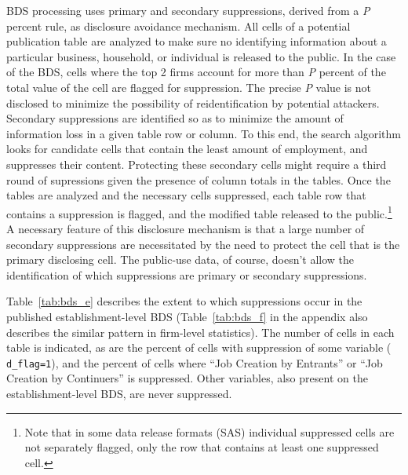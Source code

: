 
BDS processing uses primary and secondary suppressions, derived from a \emph{P} percent rule, as disclosure avoidance mechanism. All cells of a potential publication table are analyzed to make sure no identifying information about a particular business, household, or individual  is released to the public. In the case of the BDS, cells where the top 2 firms account for more than \emph{P} percent of the total value of the cell are flagged for suppression. The precise \emph{P} value is not disclosed to minimize the possibility of reidentification by potential attackers. Secondary suppressions are identified so as to minimize the amount of information loss in a given table row or column. To this end, the search algorithm looks for candidate cells that contain the least amount of employment, and suppresses their content. Protecting these secondary cells might require a third round of supressions given the presence of column totals in the tables.
Once the tables are analyzed and the necessary cells suppressed, each table row that contains a 
suppression is flagged, and the modified table released to the public.\footnote{Note that in 
some data 
release formats (SAS) individual suppressed cells are not separately flagged, only the row that 
contains at least one suppressed cell.}  A necessary feature of this disclosure mechanism is that 
a 
large number of  secondary suppressions  are necessitated by the need to protect the cell that is 
the primary disclosing cell. The public-use data, of course, doesn't allow the identification of 
which suppressions are primary or secondary suppressions.


Table~\ref{tab:bds_e} describes the extent to which suppressions occur in the  published 
establishment-level \ac{BDS} \cite{BDS2012} (Table~\ref{tab:bds_f} in 
the appendix also describes the similar pattern in firm-level statistics). The number of cells in 
each table is indicated, as are the percent of cells with  suppression of some variable ({\tt 
d\_flag=1}),  and the percent of cells where ``Job Creation by Entrants''  or ``Job Creation by 
Continuers'' is suppressed. 
Other  variables, also present on the establishment-level \ac{BDS}, are never suppressed. 


